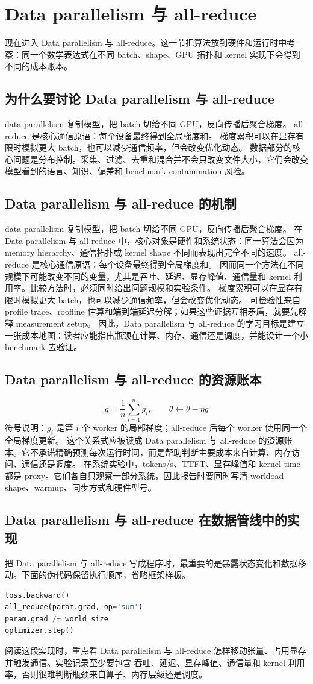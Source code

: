 \documentclass[a4paper]{article}
\begin{document}
\section{Data parallelism 与 all-reduce}
现在进入 Data parallelism 与 all-reduce。这一节把算法放到硬件和运行时中考察：同一个数学表达式在不同 batch、shape、GPU 拓扑和 kernel 实现下会得到不同的成本账本。
\subsection{为什么要讨论 Data parallelism 与 all-reduce}
data parallelism 复制模型，把 batch 切给不同 GPU，反向传播后聚合梯度。
all-reduce 是核心通信原语：每个设备最终得到全局梯度和。
梯度累积可以在显存有限时模拟更大 batch，也可以减少通信频率，但会改变优化动态。
数据部分的核心问题是分布控制。采集、过滤、去重和混合并不会只改变文件大小，它们会改变模型看到的语言、知识、偏差和 benchmark contamination 风险。
\subsection{Data parallelism 与 all-reduce 的机制}
data parallelism 复制模型，把 batch 切给不同 GPU，反向传播后聚合梯度。 在 Data parallelism 与 all-reduce 中，核心对象是硬件和系统状态：同一算法会因为 memory hierarchy、通信拓扑或 kernel shape 不同而表现出完全不同的速度。
all-reduce 是核心通信原语：每个设备最终得到全局梯度和。 因而同一个方法在不同规模下可能改变不同的变量，尤其是吞吐、延迟、显存峰值、通信量和 kernel 利用率。比较方法时，必须同时给出问题规模和实验条件。
梯度累积可以在显存有限时模拟更大 batch，也可以减少通信频率，但会改变优化动态。 可检验性来自 profile trace、roofline 估算和端到端延迟分解；如果这些证据互相矛盾，就要先解释 measurement setup。
因此，Data parallelism 与 all-reduce 的学习目标是建立一张成本地图：读者应能指出瓶颈在计算、内存、通信还是调度，并能设计一个小 benchmark 去验证。
\subsection{Data parallelism 与 all-reduce 的资源账本}
\[g=\frac{1}{n}\sum_{i=1}^{n}g_i,\qquad \theta\leftarrow \theta-\eta g\]
符号说明：\(g_i\) 是第 \(i\) 个 worker 的局部梯度；all-reduce 后每个 worker 使用同一个全局梯度更新。
这个关系式应被读成 Data parallelism 与 all-reduce 的资源账本。它不承诺精确预测每次运行时间，而是帮助判断主要成本来自计算、内存访问、通信还是调度。
在系统实验中，tokens/s、TTFT、显存峰值和 kernel time 都是 proxy。它们各自只观察一部分系统，因此报告时要同时写清 workload shape、warmup、同步方式和硬件型号。
\subsection{Data parallelism 与 all-reduce 在数据管线中的实现}
把 Data parallelism 与 all-reduce 写成程序时，最重要的是暴露状态变化和数据移动。下面的伪代码保留执行顺序，省略框架样板。
\begin{lstlisting}[language=Python]
loss.backward()
all_reduce(param.grad, op='sum')
param.grad /= world_size
optimizer.step()
\end{lstlisting}
阅读这段实现时，重点看 Data parallelism 与 all-reduce 怎样移动张量、占用显存并触发通信。实验记录至少要包含 吞吐、延迟、显存峰值、通信量和 kernel 利用率，否则很难判断瓶颈来自算子、内存层级还是调度。
\end{document}
